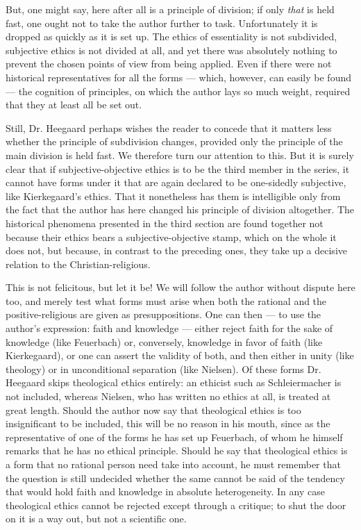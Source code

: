 \documentclass[12pt,a4paper,openany]{book}
\newcommand{\opage}[1]{\marginnote{\footnotesize\textit{[#1]}}}
\begin{document}
But, one might say, here after all is a principle of division; if only
\emph{that} is held fast, one ought not to take the author further to task.
Unfortunately it is dropped as quickly as it is set up. The ethics of
essentiality is not subdivided, subjective ethics is not divided at all,
and yet there was absolutely nothing to prevent the chosen points of view
from being applied. Even if there were not historical representatives for
all the forms --- which, however, can easily be found --- the cognition of
principles, on which the author lays so much weight, required that they at
least all be set out.

Still, Dr. Heegaard perhaps wishes the reader to concede that it matters
less whether the principle of subdivision changes, provided only the
principle of the main division is held fast. We therefore turn our
attention to this. But it is surely clear that if subjective-objective
ethics is to be the third member in the series, it cannot have forms under
it that are again declared to be one-sidedly subjective, like Kierkegaard's
ethics. That it nonetheless has them is intelligible only from the fact
that the author has here changed his principle of division altogether. The
historical phenomena presented in the third section are found together not
because their ethics bears a subjective-objective stamp, which on the whole
it does not, but because, in contrast to the preceding ones, they take up a
decisive relation to the Christian-religious.

This is not felicitous, but let it be! We will follow the author without
dispute here too, and merely test what forms must arise when both the
rational and the positive-religious are given as presuppositions. One can
then --- to use the author's expression: faith and knowledge --- either
reject faith for the sake of knowledge (like Feuerbach) or, conversely,
knowledge in favor of faith (like Kierkegaard), or one can assert the
validity of both, and then either in unity (like theology) or in
unconditional separation (like Nielsen). Of these forms Dr. Heegaard skips
theological ethics entirely: an ethicist such as Schleiermacher is not
included, whereas Nielsen, who has written no ethics at all, is treated at
great length. Should the author now say that theological ethics is too
\opage{30}insignificant to be included, this will be no reason in his mouth,
since as the representative of one of the forms he has set up Feuerbach,
of whom he himself remarks that he has no ethical principle. Should he say
that theological ethics is a form that no rational person need take into
account, he must remember that the question is still undecided whether the
same cannot be said of the tendency that would hold faith and knowledge in
absolute heterogeneity. In any case theological ethics cannot be rejected
except through a critique; to shut the door on it is a way out, but not a
scientific one.
\end{document}
